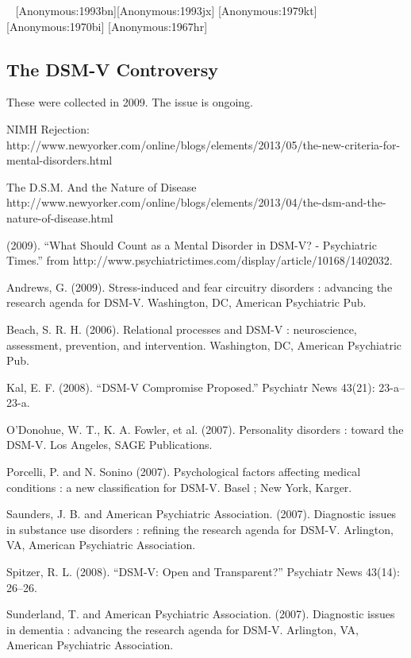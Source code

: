\begin{refsection}
~\citep{Anonymous:1993fb}
[Anonymous:1993bn][Anonymous:1993jx]
[Anonymous:1979kt][Anonymous:1970bi]
[Anonymous:1967hr]

\subsection{The DSM-V Controversy}
\label{thedsm-vcontroversy}

These were collected in 2009. The issue is ongoing.

NIMH Rejection: http:\slash \slash www.newyorker.com\slash online\slash blogs\slash elements\slash 2013\slash 05\slash the-new-criteria-for-mental-disorders.html 

The D.S.M. And the Nature of Disease
http:\slash \slash www.newyorker.com\slash online\slash blogs\slash elements\slash 2013\slash 04\slash the-dsm-and-the-nature-of-disease.html 

(2009). ``What Should Count as a Mental Disorder in DSM-V? - Psychiatric Times.'' from http:\slash \slash www.psychiatrictimes.com\slash display\slash article\slash 10168\slash 1402032.

Andrews, G. (2009). Stress-induced and fear circuitry disorders : advancing the research agenda for DSM-V. Washington, DC, American Psychiatric Pub.

Beach, S. R. H. (2006). Relational processes and DSM-V : neuroscience, assessment, prevention, and intervention. Washington, DC, American Psychiatric Pub.

Kal, E. F. (2008). ``DSM-V Compromise Proposed.'' Psychiatr News 43(21): 23-a--23-a.

O'Donohue, W. T., K. A. Fowler, et al. (2007). Personality disorders : toward the DSM-V. Los Angeles, SAGE Publications.

Porcelli, P. and N. Sonino (2007). Psychological factors affecting medical conditions : a new classification for DSM-V. Basel ; New York, Karger.

Saunders, J. B. and American Psychiatric Association. (2007). Diagnostic issues in substance use disorders : refining the research agenda for DSM-V. Arlington, VA, American Psychiatric Association.

Spitzer, R. L. (2008). ``DSM-V: Open and Transparent?'' Psychiatr News 43(14): 26--26.

Sunderland, T. and American Psychiatric Association. (2007). Diagnostic issues in dementia : advancing the research agenda for DSM-V. Arlington, VA, American Psychiatric Association.


\end{refsection}
